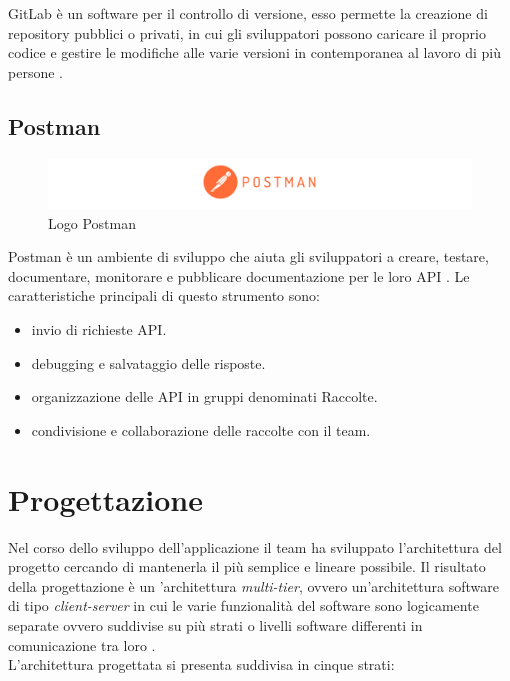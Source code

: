 GitLab è un software per il controllo di versione, esso permette la creazione di \gls{repository} pubblici o privati, in cui gli sviluppatori possono caricare il proprio codice e gestire le modifiche alle varie versioni in contemporanea al lavoro di più persone \cite{gitlab}.

\subsection{Postman}
\begin{figure}
\begin{center}
\includegraphics[width=1.0\columnwidth]{images/postmanlogo.png}
\end{center}
\caption{Logo Postman}
\label{fig:postman}
\end{figure}


Postman è un ambiente di sviluppo che aiuta gli sviluppatori a creare, testare, documentare, monitorare e pubblicare documentazione per le loro \gls{API} \cite{postman}. Le caratteristiche principali di questo strumento sono: \cite{postmaninfo}
\begin{itemize}
    \item invio di richieste \gls{API}.
    \item \gls{debugging} e salvataggio delle risposte.
    \item organizzazione delle \gls{API} in gruppi denominati Raccolte.
    \item condivisione e collaborazione delle raccolte con il team. 
\end{itemize}
\section{Progettazione}
Nel corso dello sviluppo dell'applicazione il team ha sviluppato l'architettura del progetto cercando di mantenerla il più semplice e lineare possibile. Il risultato della progettazione è un 'architettura \textit{multi-tier}, ovvero un'architettura software di tipo \textit{client-server} in cui le varie funzionalità del software sono logicamente separate ovvero suddivise su più strati o livelli software differenti in comunicazione tra loro \cite{multitier}.\\
L'architettura progettata si presenta suddivisa in cinque strati: 

